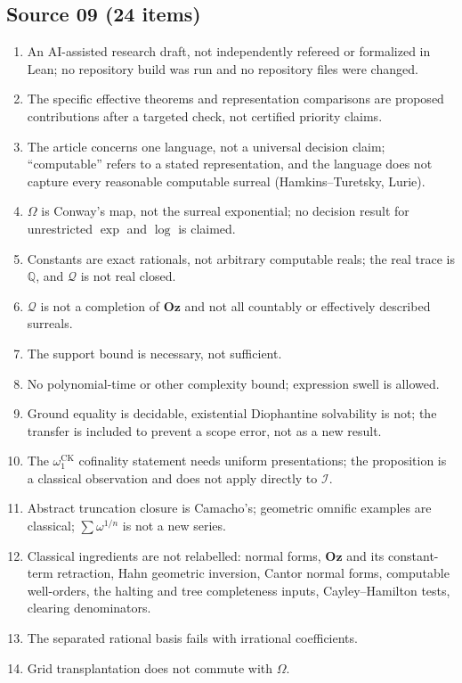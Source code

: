 \documentclass[11pt,oneside]{article}
\numberwithin{equation}{section}
\theoremstyle{definition}
\theoremstyle{remark}
\newcommand{\Oz}{\mathbf{Oz}}
\newcommand{\Q}{\mathbb Q}
\newcommand{\QO}{\mathcal Q}
\newcommand{\IO}{\mathcal I}
\newcommand{\CK}{\omega_1^{\mathrm{CK}}}
\newcommand{\Om}{\Omega}
\begin{document}
\subsection{Source 09 (24 items)}
\begin{enumerate}[leftmargin=*,widest=00,label=09.\arabic*]
\item An AI-assisted research draft, not independently refereed or formalized in
Lean; no repository build was run and no repository files were changed.
\item The specific effective theorems and representation comparisons are proposed
contributions after a targeted check, not certified priority claims.
\item The article concerns one language, not a universal decision claim;
``computable'' refers to a stated representation, and the language does not capture
every reasonable computable surreal (Hamkins--Turetsky, Lurie).
\item $\Om$ is Conway's map, not the surreal exponential; no decision result for
unrestricted $\exp$ and $\log$ is claimed.
\item Constants are exact rationals, not arbitrary computable reals; the real trace
is $\Q$, and $\QO$ is not real closed.
\item $\QO$ is not a completion of $\Oz$ and not all countably or effectively
described surreals.
\item The support bound is necessary, not sufficient.
\item No polynomial-time or other complexity bound; expression swell is allowed.
\item Ground equality is decidable, existential Diophantine solvability is not; the
transfer is included to prevent a scope error, not as a new result.
\item The $\CK$ cofinality statement needs uniform presentations; the proposition is
a classical observation and does not apply directly to $\IO$.
\item Abstract truncation closure is Camacho's; geometric omnific examples are
classical; $\sum\omega^{1/n}$ is not a new series.
\item Classical ingredients are not relabelled: normal forms, $\Oz$ and its
constant-term retraction, Hahn geometric inversion, Cantor normal forms, computable
well-orders, the halting and tree completeness inputs, Cayley--Hamilton tests,
clearing denominators.
\item The separated rational basis fails with irrational coefficients.
\item Grid transplantation does not commute with $\Om$.

\end{enumerate}
\end{document}
